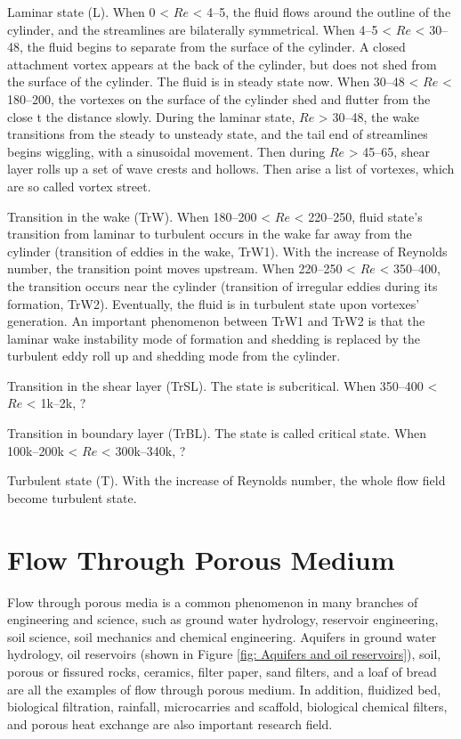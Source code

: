 Laminar state (L). When 0 < $Re$ < 4--5, the fluid flows around the outline of the cylinder, and the streamlines are bilaterally symmetrical. When 4--5 < $Re$ < 30--48, the fluid begins to separate from the surface of the cylinder. A closed attachment vortex appears at the back of the cylinder, but does not shed from the surface of the cylinder. The fluid is in steady state now. When 30--48 < $Re$ < 180--200, the vortexes on the surface of the cylinder shed and flutter from the close t the distance slowly. During the laminar state, $Re$ > 30--48, the wake transitions from the steady to unsteady state, and the tail end of streamlines begins wiggling, with a sinusoidal movement. Then during $Re$ > 45--65, shear layer rolls up a set of wave crests and hollows. Then arise a list of vortexes, which are so called vortex street. 

Transition in the wake (TrW). When 180--200 < $Re$ < 220--250, fluid state's transition from laminar to turbulent occurs in the wake far away from the cylinder (transition of eddies in the wake, TrW1). With the increase of Reynolds number, the transition point moves upstream. When 220--250 < $Re$ < 350--400, the transition occurs near the cylinder (transition of irregular eddies during its formation, TrW2). Eventually, the fluid is in turbulent state upon vortexes' generation. An important phenomenon between TrW1 and TrW2 is that the laminar wake instability mode of formation and shedding is replaced by the turbulent eddy roll up and shedding mode from the cylinder\cite{Zdravkovich1997b}.

Transition in the shear layer (TrSL). The state is subcritical. When 350--400 < $Re$ < 1k--2k, ? 

Transition in boundary layer (TrBL). The state is called critical state. When 100k--200k < $Re$ < 300k--340k, ?

Turbulent state (T). With the increase of Reynolds number, the whole flow field become turbulent state.


\section{Flow Through Porous Medium}
Flow through porous media is a common phenomenon in many branches of engineering and science, such as ground water hydrology, reservoir engineering, soil science, soil mechanics and chemical engineering\cite{Bear2013}. Aquifers in ground water hydrology, oil reservoirs (shown in Figure \ref{fig: Aquifers and oil reservoirs}), soil, porous or fissured rocks, ceramics, filter paper, sand filters, and a loaf of bread are all the examples of flow through porous medium. In addition, fluidized bed, biological filtration, rainfall, microcarries and scaffold, biological chemical filters, and porous heat exchange are also important research field.

